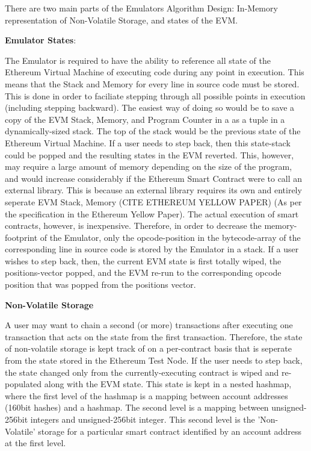 \documentclass{report}
\begin{document}
        There are two main parts of the Emulators Algorithm Design: In-Memory representation of Non-Volatile Storage, and states of the EVM.
        \newpage

    \vspace{0.5cm}

    \textbf{Emulator States}:

    \vspace{0.5cm}

        The Emulator is required to have the ability to reference all state of the Ethereum Virtual Machine of executing code during any point in execution. This means that the Stack and Memory for every line in source code must be stored. This is done in order to faciliate stepping through all possible points in execution (including stepping backward). The easiest way of doing so would be to save a copy of the EVM Stack, Memory, and Program Counter in a as a tuple in a dynamically-sized stack. The top of the stack would be the previous state of the Ethereum Virtual Machine. If a user needs to step back, then this state-stack could be popped and the resulting states in the EVM reverted. This, however, may require a large amount of memory depending on the size of the program, and would increase considerably if the Ethereum Smart Contract were to call an external library. This is because an external library requires its own and entirely seperate EVM Stack, Memory (CITE ETHEREUM YELLOW PAPER) (As per the specification in the Ethereum Yellow Paper). The actual execution of smart contracts, however, is inexpensive. Therefore, in order to decrease the memory-footprint of the Emulator, only the opcode-position in the bytecode-array of the corresponding line in source code is stored by the Emulator in a stack. If a user wishes to step back, then, the current EVM state is first totally wiped, the positions-vector popped, and the EVM re-run to the corresponding opcode position that was popped from the positions vector.

        \vspace{0.5cm}

        \textbf{Non-Volatile Storage}

        \vspace{0.5cm}

            A user may want to chain a second (or more) transactions after executing one transaction that acts on the state from the first transaction. Therefore, the state of non-volatile storage is kept track of on a per-contract basis that is seperate from the state stored in the Ethereum Test Node. If the user needs to step back, the state changed only from the currently-executing contract is wiped and re-populated along with the EVM state. This state is kept in a nested hashmap, where the first level of the hashmap is a mapping between account addresses (160bit hashes) and a hashmap. The second level is a mapping between unsigned-256bit integers and unsigned-256bit integer. This second level is the 'Non-Volatile' storage for a particular smart contract identified by an account address at the first level.
\end{document}
